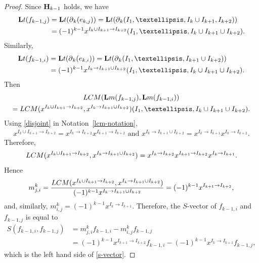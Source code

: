 \documentclass[10pt]{amsart}
\newcommand{\lm}{\mbox{${\bf L}{\rm m}$}}
\newcommand{\lt}{\mbox{${\bf L}{\rm t}$}}
\newcommand{\mbfh}{\mbox{${\bf H}$}}
\newcommand{\dif}{\mbox{$\partial$}}
\newcommand{\Lcm}{\mbox{${\rm LCM}$}}
\theoremstyle{definition}
\theoremstyle{remark}
\begin{document}
\begin{proof}
Since $\mbfh_{k-1}$ holds, we have
\begin{align*}
\lt(f_{k-1,j})&=\lt(\dif_{k}(e_{k,j}))=\lt(\dif_{k}(I_1,\ldots,I_{k}\cup
I_{k+1},I_{k+2}))\\
&= (-1)^{k-1}x^{I_{k}\cup I_{k+1}\to I_{k+2}}(I_1,\ldots
,I_{k}\cup I_{k+1}\cup I_{k+2}).
\end{align*}
Similarly,
\begin{align*}
\lt(f_{k-1,i})&=\lt(\dif_{k}(e_{k,i}))=\lt(\dif_{k}(I_1,\ldots,
I_{k+1}\cup I_{k+2}))\\
&= (-1)^{k-1}x^{I_{k}\to I_{k+1}\cup I_{k+2}}(I_1,\ldots
,I_{k}\cup I_{k+1}\cup I_{k+2}).
\end{align*}
Then 
\begin{multline*}
\Lcm(\lm(f_{k-1,j}),\lm(f_{k-1,i}))\\
= \Lcm(x^{I_{k}\cup I_{k+1}\to
  I_{k+2}},x^{I_{k}\to I_{k+1}\cup I_{k+2}})(I_1,\ldots ,I_{k}\cup
I_{k+1}\cup I_{k+2}).
\end{multline*}
Using \eqref{disjoint} in Notation~\ref{lcm-notation},
\begin{eqnarray*}
x^{I_{k}\cup I_{k+1}\to I_{k+2}}=x^{I_{k}\to I_{k+2}}x^{I_{k+1}\to
  I_{k+2}}\mbox{ and } x^{I_{k}\to I_{k+1}\cup I_{k+2}}=x^{I_{k}\to
  I_{k+1}}x^{I_{k}\to I_{k+2}}.
\end{eqnarray*}
Therefore,
\begin{eqnarray*}
\Lcm(x^{I_{k}\cup I_{k+1}\to I_{k+2}},x^{I_{k}\to I_{k+1}\cup
  I_{k+2}})=x^{I_{k}\to I_{k+2}}x^{I_{k+1}\to I_{k+2}}x^{I_{k}\to I_{k+1}}.
\end{eqnarray*}
Hence
\begin{eqnarray*}
m^{k}_{j,i}= \frac{\Lcm(x^{I_{k}\cup I_{k+1}\to
    I_{k+2}},x^{I_{k}\to I_{k+1}\cup
    I_{k+2}})}{(-1)^{k-1}x^{I_{k}\to I_{k+1}\cup
    I_{k+2}}}=(-1)^{k-1}x^{I_{k+1}\to I_{k+2}},
\end{eqnarray*}
and, similarly, $m^{k}_{i,j}=(-1)^{k-1}x^{I_{k}\to
  I_{k+1}}$. Therefore, the $S$-vector of $f_{k-1,i}$ and $f_{k-1,j}$ is
equal to
\begin{align*}
 S(f_{k-1,i},f_{k-1,j})&=m^{k}_{j,i}f_{k-1,i}-m^{k}_{i,j}f_{k-1,j}\\
&= (-1)^{k-1}x^{I_{k+1}\to
  I_{k+2}}f_{k-1,i}-(-1)^{k-1}x^{I_{k}\to I_{k+1}}f_{k-1,j},
\end{align*}
which is the left hand side of \eqref{s-vector}.


\end{proof}
\end{document}

